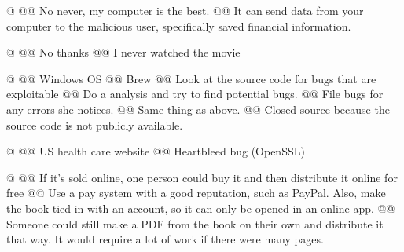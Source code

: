 \documentclass{article}
\begin{document}
\begin{easylist}
 	@
 	@@ No never, my computer is the best.
 	@@ It can send data from your computer to the malicious user, specifically saved financial information.
 	
 	@
 	@@ No thanks
 	@@ I never watched the movie
 	
 	@
 	@@ Windows OS
 	@@ Brew
 	@@ Look at the source code for bugs that are exploitable
 	@@ Do a analysis and try to find potential bugs.
 	@@ File bugs for any errors she notices.
 	@@ Same thing as above.
 	@@ Closed source because the source code is not publicly available.
 	
 	@
 	@@ US health care website
 	@@ Heartbleed bug (OpenSSL)
 	
 	@
 	@@ If it's sold online, one person could buy it and then distribute it online for free
 	@@ Use a pay system with a good reputation, such as PayPal. Also, make the book tied in with an account, so it can only be opened in an online app.
 	@@ Someone could still make a PDF from the book on their own and distribute it that way. It would require a lot of work if there were many pages.
 
\end{easylist}
\end{document}
